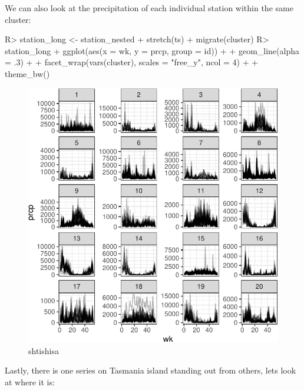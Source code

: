\documentclass[
]{jss}
\begin{document}
We can also look at the precipitation of each individual station within
the same cluster:

\begin{CodeChunk}
\begin{CodeInput}
R> station_long <- station_nested %
+   stretch(ts) %
+   migrate(cluster)
R> station_long %
+   ggplot(aes(x = wk, y = prcp, group = id)) +
+   geom_line(alpha = .3) +
+   facet_wrap(vars(cluster), scales = "free_y", ncol = 4) +
+   theme_bw()
\end{CodeInput}
\begin{figure}

{\centering \includegraphics{figures/unnamed-chunk-16-1} 

}

\caption[shtishisa]{shtishisa}\label{fig:unnamed-chunk-16}
\end{figure}
\end{CodeChunk}

Lastly, there is one series on Tasmania island standing out from others,
lets look at where it is:
\end{document}
